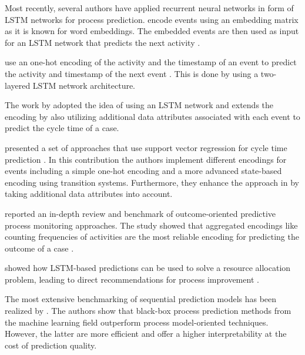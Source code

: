 Most recently, several authors have applied recurrent neural networks in form of LSTM networks for process prediction. \citeauthor{ DBLP:conf/bpm/EvermannRF16} encode events using an embedding matrix as it is known for word embeddings. The embedded events are then used as input for an LSTM network that predicts the next activity \cite{DBLP:conf/bpm/EvermannRF16}.

\citeauthor{DBLP:conf/caise/TaxVRD17} use an one-hot encoding of the activity and the timestamp of an event to predict the activity and timestamp of the next event \cite{DBLP:conf/caise/TaxVRD17}.
This is done by using a two-layered LSTM network architecture.

The work by \citeauthor{DBLP:conf/ssci/NavarinVPS17} adopted the idea of using an LSTM network \cite{DBLP:conf/caise/TaxVRD17} and extends the encoding by also utilizing additional data attributes associated with each event \cite{DBLP:conf/ssci/NavarinVPS17} to predict the cycle time of a case.

\citeauthor{DBLP:journals/computing/PolatoSBL18} presented a set of approaches that use support vector regression for cycle time prediction  \cite{DBLP:journals/computing/PolatoSBL18}.
In this contribution the authors implement different encodings for events including a simple one-hot encoding and a more advanced state-based encoding using transition systems.
Furthermore, they enhance the approach in \cite{DBLP:journals/is/AalstSS11} by taking additional data attributes into account.

\citeauthor{DBLP:journals/tkdd/TeinemaaDRM19} reported an in-depth review and benchmark of outcome-oriented predictive process monitoring approaches.
The study showed that aggregated encodings like counting frequencies of activities are the most reliable encoding for predicting the outcome of a case \cite{DBLP:journals/tkdd/TeinemaaDRM19}.

\citeauthor{DBLP:conf/icpm/ParkS19} showed how LSTM-based predictions can be used to solve a resource allocation problem, leading to direct recommendations for process improvement \cite{DBLP:conf/icpm/ParkS19}.

The most extensive benchmarking of sequential prediction models has been realized by \citeauthor{DBLP:journals/sosym/TaxTZ20} \cite{DBLP:journals/sosym/TaxTZ20}.
The authors show that black-box process prediction methods from the machine learning field outperform process model-oriented techniques.
However, the latter are more efficient and offer a higher interpretability at the cost of prediction quality.

